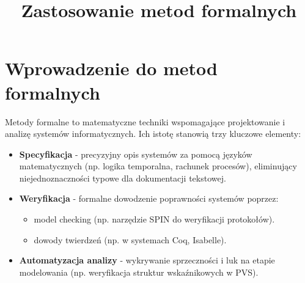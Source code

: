 \documentclass[conference]{IEEEtran}
\begin{document}
    \title{Zastosowanie metod formalnych}

    \author{
       \and
    }
    \maketitle

    \section{Wprowadzenie do metod formalnych}
    Metody formalne to matematyczne techniki wspomagające projektowanie i analizę systemów informatycznych. Ich istotę stanowią trzy kluczowe elementy:

        \begin{itemize}
            \item \textbf{Specyfikacja} - precyzyjny opis systemów za pomocą języków matematycznych (np. logika temporalna, rachunek procesów), eliminujący niejednoznaczności typowe dla dokumentacji tekstowej.
            
            \item \textbf{Weryfikacja} - formalne dowodzenie poprawności systemów poprzez:
            \begin{itemize}
                \item model checking (np. narzędzie SPIN do weryfikacji protokołów).
                \item dowody twierdzeń (np. w systemach Coq, Isabelle).
            \end{itemize}
            
            \item \textbf{Automatyzacja analizy} - wykrywanie sprzeczności i luk na etapie modelowania (np. weryfikacja struktur wskaźnikowych w PVS).
        \end{itemize}
\end{document}
